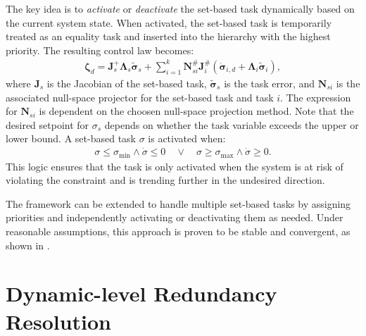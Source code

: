 The key idea is to \emph{activate} or \emph{deactivate} the set-based task dynamically based on the current system state. When activated, the set-based task is temporarily treated as an equality task and inserted into the hierarchy with the highest priority. The resulting control law becomes:
\begin{align}
    \bm{\zeta}_d = \bm{J}_s^{+}\bm{\Lambda}_s \tilde{\bm{\sigma}}_s + \sum_{i=1}^k \bm{N}_{si}^{\#}\bm{J}_i^{\#} \left(\dot{\bm{\sigma}}_{i,d} + \bm{\Lambda}_i \tilde{\bm{\sigma}}_i\right),
\end{align}
where \(\bm{J}_s\) is the Jacobian of the set-based task, \(\tilde{\bm{\sigma}}_s\) is the task error, and \(\bm{N}_{si}\) is the associated null-space projector for the set-based task and task \(i\). The expression for \(\bm{N}_{si}\) is dependent on the choosen null-space projection method. Note that the desired setpoint for \(\sigma_s\) depends on whether the task variable exceeds the upper or lower bound. A set-based task \(\sigma\) is activated when:
\begin{align}
    \sigma \leq \sigma_{\text{min}} \land \dot{\sigma} \leq 0 \quad \lor \quad \sigma \geq \sigma_{\text{max}} \land \dot{\sigma} \geq 0.
\end{align}
This logic ensures that the task is only activated when the system is at risk of violating the constraint and is trending further in the undesired direction.

The framework can be extended to handle multiple set-based tasks by assigning priorities and independently activating or deactivating them as needed. Under reasonable assumptions, this approach is proven to be stable and convergent, as shown in \cite{moe}.



\section{Dynamic-level Redundancy Resolution}
\label{sec:tpc:dynamic_level}


